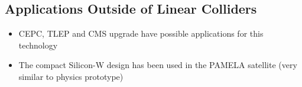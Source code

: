 
\subsection{Applications Outside of Linear Colliders}
\begin{itemize}
	\item CEPC, TLEP and CMS upgrade have possible applications for this technology
	\item The compact Silicon-W design has been used in the PAMELA satellite (very similar to physics prototype)~\cite{1742-6596-160-1-012039}
\end{itemize}

